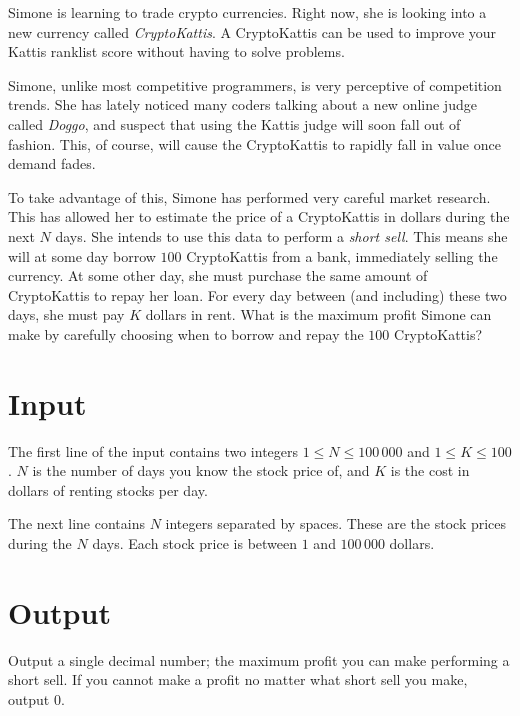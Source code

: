 Simone is learning to trade crypto currencies.
Right now, she is looking into a new currency called \emph{CryptoKattis}.
A CryptoKattis can be used to improve your Kattis ranklist score without having to solve problems.

Simone, unlike most competitive programmers, is very perceptive of competition trends.
She has lately noticed many coders talking about a new online judge called \emph{Doggo}, and suspect that using the Kattis judge will soon fall out of fashion.
This, of course, will cause the CryptoKattis to rapidly fall in value once demand fades.

To take advantage of this, Simone has performed very careful market research.
This has allowed her to estimate the price of a CryptoKattis in dollars during the next $N$ days.
She intends to use this data to perform a \emph{short sell}.
This means she will at some day borrow $100$ CryptoKattis from a bank, immediately selling the currency.
At some other day, she must purchase the same amount of CryptoKattis to repay her loan.
For every day between (and including) these two days, she must pay $K$ dollars in rent.
What is the maximum profit Simone can make by carefully choosing when to borrow and repay the $100$ CryptoKattis?

\section*{Input}
The first line of the input contains two integers $1 \le N \le 100\,000$ and $1 \le K \le 100$.
$N$ is the number of days you know the stock price of, and $K$ is the cost in dollars of renting stocks per day.

The next line contains $N$ integers separated by spaces.
These are the stock prices during the $N$ days.
Each stock price is between $1$ and $100\,000$ dollars.

\section*{Output}
Output a single decimal number; the maximum profit you can make performing a short sell.
If you cannot make a profit no matter what short sell you make, output $0$.
